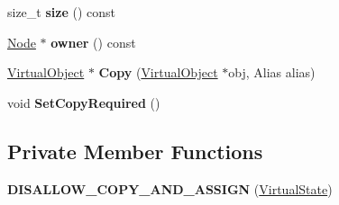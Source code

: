 \begin{DoxyCompactItemize}
\item 
size\+\_\+t {\bfseries size} () const \hypertarget{classv8_1_1internal_1_1compiler_1_1_virtual_state_adfa136ec3860d51df2fd1ec80a5d8ca0}{}\label{classv8_1_1internal_1_1compiler_1_1_virtual_state_adfa136ec3860d51df2fd1ec80a5d8ca0}

\item 
\hyperlink{classv8_1_1internal_1_1compiler_1_1_node}{Node} $\ast$ {\bfseries owner} () const \hypertarget{classv8_1_1internal_1_1compiler_1_1_virtual_state_a7cb610698be09c59cb281a55ae5c2188}{}\label{classv8_1_1internal_1_1compiler_1_1_virtual_state_a7cb610698be09c59cb281a55ae5c2188}

\item 
\hyperlink{classv8_1_1internal_1_1compiler_1_1_virtual_object}{Virtual\+Object} $\ast$ {\bfseries Copy} (\hyperlink{classv8_1_1internal_1_1compiler_1_1_virtual_object}{Virtual\+Object} $\ast$obj, Alias alias)\hypertarget{classv8_1_1internal_1_1compiler_1_1_virtual_state_a2aeacc2d48eb3b712a86d5de5886c488}{}\label{classv8_1_1internal_1_1compiler_1_1_virtual_state_a2aeacc2d48eb3b712a86d5de5886c488}

\item 
void {\bfseries Set\+Copy\+Required} ()\hypertarget{classv8_1_1internal_1_1compiler_1_1_virtual_state_a355515d5ca23112c711ec189456864e1}{}\label{classv8_1_1internal_1_1compiler_1_1_virtual_state_a355515d5ca23112c711ec189456864e1}

\end{DoxyCompactItemize}
\subsection*{Private Member Functions}
\begin{DoxyCompactItemize}
\item 
{\bfseries D\+I\+S\+A\+L\+L\+O\+W\+\_\+\+C\+O\+P\+Y\+\_\+\+A\+N\+D\+\_\+\+A\+S\+S\+I\+GN} (\hyperlink{classv8_1_1internal_1_1compiler_1_1_virtual_state}{Virtual\+State})\hypertarget{classv8_1_1internal_1_1compiler_1_1_virtual_state_a15749af7e57e6e94859de9cf468cf839}{}\label{classv8_1_1internal_1_1compiler_1_1_virtual_state_a15749af7e57e6e94859de9cf468cf839}

\end{DoxyCompactItemize}
